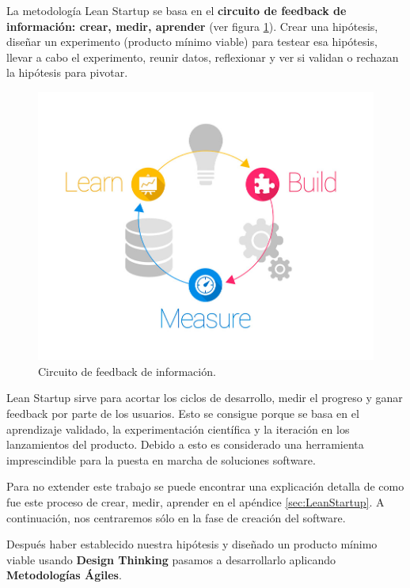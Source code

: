 \documentclass[12pt,twoside,titlepage]{report}
\begin{document}
La metodología Lean Startup se basa en el \textbf{circuito de feedback de información: crear, medir, aprender} (ver figura \ref{fig:LeanStartup}). Crear una hipótesis, diseñar un experimento (producto mínimo viable) para testear esa hipótesis, llevar a cabo el experimento, reunir datos, reflexionar y ver si validan o rechazan la hipótesis para pivotar.

\begin{figure}[H]
    \centering
    \includegraphics[scale=0.3]{Lean Startup/CircuitoFeedback}
    \caption{Circuito de feedback de información.}
    \label{fig:LeanStartup}
\end{figure}

Lean Startup sirve para acortar los ciclos de desarrollo, medir el progreso y ganar feedback por parte de los usuarios. Esto se consigue porque se basa en el aprendizaje validado, la experimentación científica y la iteración en los lanzamientos del producto. 
Debido a esto es considerado una herramienta imprescindible para la puesta en marcha de soluciones software. 

Para no extender este trabajo se puede encontrar una explicación detalla de como fue este proceso de crear, medir, aprender en el apéndice \ref{sec:LeanStartup}. A continuación, nos centraremos sólo en la fase de creación del software.

Después haber establecido nuestra hipótesis y diseñado un producto mínimo viable usando \textbf{Design Thinking} pasamos a desarrollarlo aplicando \textbf{Metodologías Ágiles}.
\end{document}
